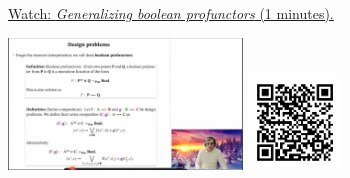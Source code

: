 
\begin{minipage}{10cm}
    \href{https://act4e-spring21.netlify.app/videos/spring2021-profunctors:gen-bool.html}{Watch: \emph{Generalizing boolean profunctors} (1 minutes).}
        
    \href{https://act4e-spring21.netlify.app/videos/spring2021-profunctors:gen-bool.html}{\includegraphics[height=3.5cm]{spring2021-profunctors:gen-bool/thumbnails.jpg}}
    \href{https://act4e-spring21.netlify.app/videos/spring2021-profunctors:gen-bool.html}{\includegraphics[height=2.5cm]{spring2021-profunctors:gen-bool/qrcode.png}}
\end{minipage}
